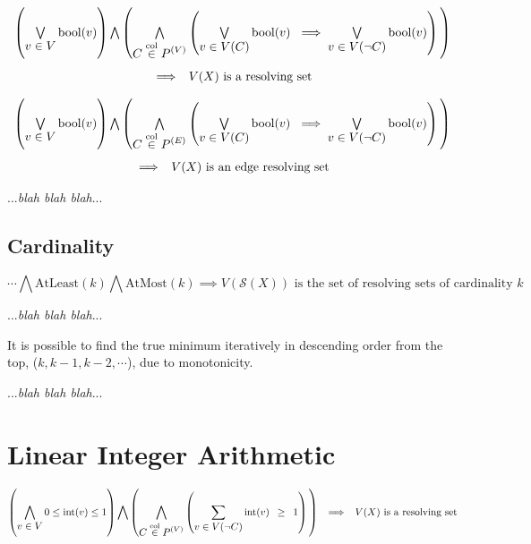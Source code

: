 \documentclass{article}
\newcommand{\combine}[7]{#1 #2 \vphantom{#6} #3 #4 #5 #6 \vphantom{#2} #7}
\begin{document}
	\[
	\begin{array}{c}
		\combine{\left(}{\bigvee \limits_{\displaystyle v \in V} \mathrm{bool}(v)}{\right)}{\bigwedge}{\left(}{\bigwedge \limits_{\displaystyle C \overset{\mathrm{col}}{\in} P^{(V)}} \left( \bigvee \limits_{\displaystyle v \in V(C)} \mathrm{bool}(v)\ \implies \bigvee \limits_{\displaystyle v \in V(\neg C)} \mathrm{bool}(v) \right)}{\right)} \\ [24pt]
		\implies\enspace V(X) \text{ is a resolving set}
	\end{array}
	\]

	\[
	\begin{array}{c}
		\combine{\left(}{\bigvee \limits_{\displaystyle v \in V} \mathrm{bool}(v)}{\right)}{\bigwedge}{\left(}{\bigwedge \limits_{\displaystyle C \overset{\mathrm{col}}{\in} P^{(E)}} \left( \bigvee \limits_{\displaystyle v \in V(C)} \mathrm{bool}(v)\ \implies \bigvee \limits_{\displaystyle v \in V(\neg C)} \mathrm{bool}(v) \right)}{\right)} \\ [24pt]
		\implies\enspace V(X) \text{ is an edge resolving set}
	\end{array}
	\]

	...\textit{blah blah blah}...

	\clearpage
	\subsection{Cardinality}

	\[ \cdots \bigwedge \mathrm{AtLeast}(k) \bigwedge \mathrm{AtMost}(k) \implies V(\mathcal{S}(X)) \text{ is the set of resolving sets of cardinality } k \]

	...\textit{blah blah blah}...

	It is possible to find the true minimum iteratively in descending order from the top, (\(k, k - 1, k - 2, \cdots\)), due to monotonicity.

	...\textit{blah blah blah}...

	\clearpage
	\section{Linear Integer Arithmetic}

	\[ \combine{\left(}{\bigwedge \limits_{\displaystyle v \in V} 0 \leq \mathrm{int}(v) \leq 1}{\right)}{\bigwedge}{\left(}{\bigwedge \limits_{\displaystyle C \overset{\mathrm{col}}{\in} P^{(V)}} \left( \sum \limits_{\displaystyle v \in V(\neg C)} \mathrm{int}(v)\enspace \geq\enspace 1 \right)}{\right)}\enspace \implies\enspace V(X) \text{ is a resolving set} \]
\end{document}
